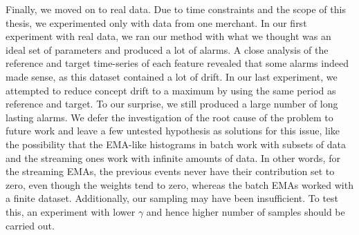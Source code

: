 Finally, we moved on to real data. Due to time constraints and the scope of this thesis, we experimented only with data from one merchant. In our first experiment with real data, we ran our method with what we thought was an ideal set of parameters and produced a lot of alarms. A close analysis of the reference and target time-series of each feature revealed that some alarms indeed made sense, as this dataset contained a lot of drift. In our last experiment, we attempted to reduce concept drift to a maximum by using the same period as reference and target. To our surprise, we still produced a large number of long lasting alarms. We defer the investigation of the root cause of the problem to future work and leave a few untested hypothesis as solutions for this issue, like the possibility that the EMA-like histograms in batch work with subsets of data and the streaming ones work with infinite amounts of data. In other words, for the streaming EMAs, the previous events never have their contribution set to zero, even though the weights tend to zero, whereas the batch EMAs worked with a finite dataset. Additionally, our sampling may have been insufficient. To test this, an experiment with lower $\gamma$ and hence higher number of samples should be carried out.